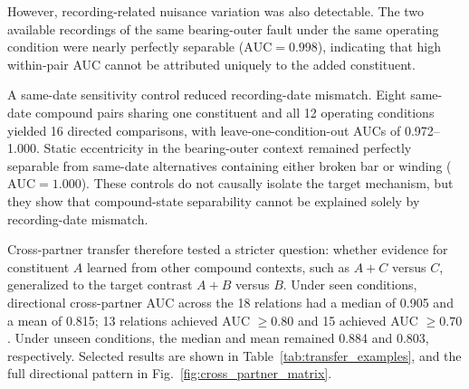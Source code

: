 \documentclass{ieeeaccess}
\begin{document}
However, recording-related nuisance variation was also detectable. The two
available recordings of the same bearing-outer fault under the same operating
condition were nearly perfectly separable ($\mathrm{AUC}=0.998$), indicating
that high within-pair AUC cannot be attributed uniquely to the added
constituent.

A same-date sensitivity control reduced recording-date mismatch. Eight
same-date compound pairs sharing one constituent and all 12 operating
conditions yielded 16 directed comparisons, with leave-one-condition-out AUCs
of 0.972--1.000. Static eccentricity in the bearing-outer context remained
perfectly separable from same-date alternatives containing either broken bar
or winding ($\mathrm{AUC}=1.000$). These controls do not causally isolate the
target mechanism, but they show that compound-state separability cannot be
explained solely by recording-date mismatch.

Cross-partner transfer therefore tested a stricter question: whether evidence
for constituent $A$ learned from other compound contexts, such as $A+C$
versus $C$, generalized to the target contrast $A+B$ versus $B$. Under seen
conditions, directional cross-partner AUC across the 18 relations had a median
of 0.905 and a mean of 0.815; 13 relations achieved AUC $\geq0.80$ and 15
achieved AUC $\geq0.70$. Under unseen conditions, the median and mean remained
0.884 and 0.803, respectively. Selected results are shown in
Table~\ref{tab:transfer_examples}, and the full directional pattern in
Fig.~\ref{fig:cross_partner_matrix}.
\end{document}
